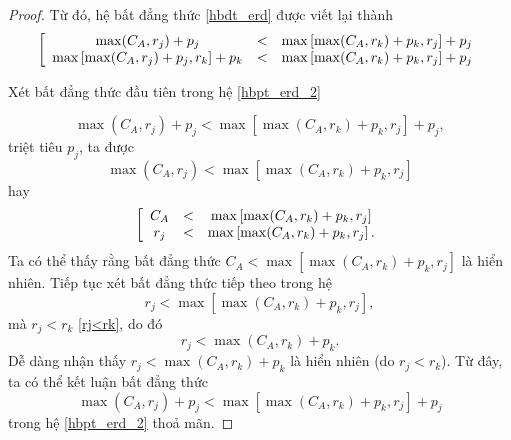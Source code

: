 \begin{proof}
	Từ đó, hệ bất đẳng thức \eqref{hbdt_erd} được viết lại thành
	\begin{equation} \label{hbpt_erd_2}
		\left[
			\begin{array}{c c c}
				\max (C_A, r_j) + p_j &<& \max \left[ \max (C_A, r_k) + p_k, r_j \right] + p_j \\
				\max \left[ \max (C_A, r_j) + p_j, r_k \right] + p_k &<& \max \left[ \max (C_A, r_k) + p_k, r_j \right] + p_j
			\end{array}
		\right.
	\end{equation}

	Xét bất đẳng thức đầu tiên trong hệ \eqref{hbpt_erd_2}

	\begin{equation}
		\max (C_A, r_j) + p_j < \max \left[ \max (C_A, r_k) + p_k, r_j \right] + p_j,
	\end{equation}
	triệt tiêu $p_j$, ta được
	\begin{equation}
		\max (C_A, r_j) < \max \left[ \max (C_A, r_k) + p_k, r_j \right]
	\end{equation}
	hay
	\begin{equation}
		\left[
			\begin{array}{c c c}
				C_A &<& \max \left[ \max (C_A, r_k) + p_k, r_j \right] \\
				r_j &<& \max \left[ \max (C_A, r_k) + p_k, r_j \right].
			\end{array}
		\right.
	\end{equation}
	Ta có thể thấy rằng bất đẳng thức $C_A < \max \left[ \max (C_A, r_k) + p_k, r_j \right]$ là hiển nhiên.
	Tiếp tục xét bất đẳng thức tiếp theo trong hệ
	\begin{equation}
			r_j < \max \left[ \max (C_A, r_k) + p_k, r_j \right],
	\end{equation}
	mà $r_j<r_k$ \eqref{rj<rk}, do đó
	\begin{equation}
			r_j < \max (C_A, r_k) + p_k.
	\end{equation}
	Dễ dàng nhận thấy $r_j < \max (C_A, r_k) + p_k$ là hiển nhiên (do $r_j<r_k$). Từ đây, ta có thể kết luận bất đẳng thức
	\begin{equation*}
		\max (C_A, r_j) + p_j < \max \left[ \max (C_A, r_k) + p_k, r_j \right] + p_j
	\end{equation*}
	trong hệ \eqref{hbpt_erd_2} thoả mãn.


\end{proof}
